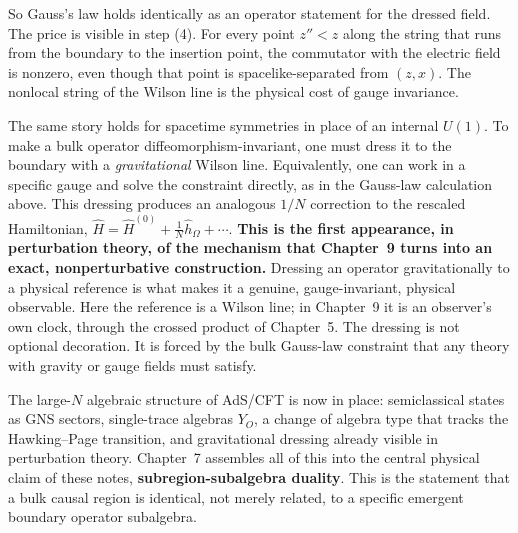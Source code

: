 So Gauss's law holds identically as an operator statement for the dressed field. The price is visible in step
(4). For every point $z''<z$ along the string that runs from the boundary to the insertion point, the
commutator with the electric field is nonzero, even though that point is spacelike-separated from $(z,x)$. The
nonlocal string of the Wilson line is the physical cost of gauge invariance.

The same story holds for spacetime symmetries in place of an internal $U(1)$. To make a bulk operator
diffeomorphism-invariant, one must dress it to the boundary with a \emph{gravitational} Wilson line.
Equivalently, one can work in a specific gauge and solve the constraint directly, as in the Gauss-law
calculation above. This dressing produces an analogous $1/N$ correction to the rescaled Hamiltonian,
$\widehat H=\widehat H^{(0)}+\tfrac1N\hat h_\Omega+\cdots$. \textbf{This is the first appearance, in perturbation
theory, of the mechanism that Chapter~9 turns into an exact, nonperturbative construction.} Dressing an operator
gravitationally to a physical reference is what makes it a genuine, gauge-invariant, physical observable. Here
the reference is a Wilson line; in Chapter~9 it is an observer's own clock, through the crossed product of
Chapter~5. The dressing is not optional decoration. It is forced by the bulk Gauss-law constraint that any
theory with gravity or gauge fields must satisfy.

\bigskip
\noindent The large-$N$ algebraic structure of AdS/CFT is now in place: semiclassical states as GNS sectors,
single-trace algebras $Y_O$, a change of algebra type that tracks the Hawking--Page transition, and
gravitational dressing already visible in perturbation theory. Chapter~7 assembles all of this into the central
physical claim of these notes, \textbf{subregion-subalgebra duality}. This is the statement that a bulk causal
region is identical, not merely related, to a specific emergent boundary operator subalgebra.
